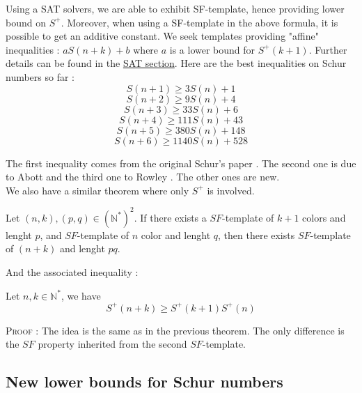 Using a SAT solvers, we are able to exhibit SF-template,
hence providing lower bound on \(S^+\). Moreover, when using
a SF-template in the above formula, it is possible to get an additive constant. We seek templates providing "affine"
inequalities : \(aS(n+k) + b \) where \(a\) is a lower bound for \(S^+(k+1)\). Further details can be found in the
\hyperref[SAT]{SAT section}.
Here are the best inequalities on Schur numbers so far :
\[ S(n+1) \geqslant 3S(n) + 1 \]
\[ S(n+2) \geqslant 9S(n) + 4 \]
\[ S(n+3) \geqslant 33S(n) + 6 \]
\[ S(n+4) \geqslant 111S(n) + 43 \]
\[ S(n+5) \geqslant 380S(n) + 148 \]
\[ S(n+6) \geqslant 1140S(n) + 528 \]

The first inequality comes from the original Schur's paper \cite{Schur1917}. The second one is due to
Abott \cite{AbbottHanson}
and the third one to Rowley \cite{RowleyRamsey}. The other ones are new. \\

We also have a similar theorem where only \(S^+\) is involved.

\begin{theorem}
	Let \((n,k), (p,q) \in (\mathbb{N}^*)^2\). If there exists a \(SF\)-template of \(k+1\) colors and lenght \(p\),
	and \(SF\)-template of \(n\) color and lenght \(q\), then there exists \(SF\)-template of \((n+k)\) and lenght \(pq\).
\end{theorem}

And the associated inequality :

\begin{corollary}
	Let \(n, k \in \mathbb{N}^*\), we have \\
	\[ S^+(n+k) \geqslant S^+(k+1)S^+(n) \]
\end{corollary}

\textsc{Proof :} The idea is the same as in the previous theorem. The only difference is the \(SF\) property inherited 
from the second \(SF\)-template.



\subsection{New lower bounds for Schur numbers}

